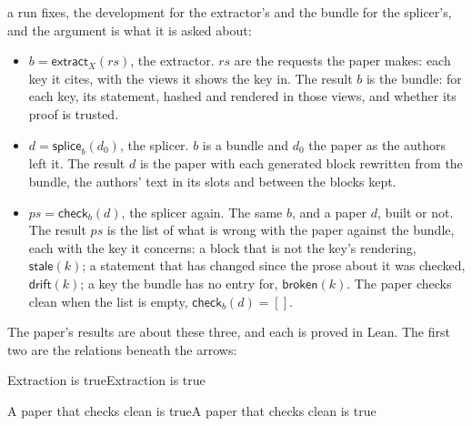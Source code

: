 \documentclass[acmsmall,screen,review,anonymous,nonacm]{acmart}
\begin{document}
a run fixes, the development for the extractor's and the bundle for the
splicer's, and the argument is what it is asked about:
\begin{itemize}
\item $b = \mathsf{extract}_{X}(\mathit{rs})$, the extractor.
  $\mathit{rs}$ are the requests the paper makes: each key it cites, with
  the views it shows the key in. The result $b$ is the bundle: for each
  key, its statement, hashed and rendered in those views, and whether its
  proof is trusted.
\item $d = \mathsf{splice}_{b}(d_{0})$, the splicer. $b$ is a bundle and
  $d_{0}$ the paper as the authors left it. The result $d$ is the paper
  with each generated block rewritten from the bundle, the authors' text
  in its slots and between the blocks kept.
\item $\mathit{ps} = \mathsf{check}_{b}(d)$, the splicer again. The same
  $b$, and a paper $d$, built or not. The result $\mathit{ps}$ is the list
  of what is wrong with the paper against the bundle, each with the key it
  concerns: a block that is not the key's rendering, $\mathsf{stale}(k)$;
  a statement that has changed since the prose about it was checked,
  $\mathsf{drift}(k)$; a key the bundle has no entry for,
  $\mathsf{broken}(k)$. The paper checks clean when the list is empty,
  $\mathsf{check}_{b}(d) = []$.
\end{itemize}
The paper's results are about these three, and each is proved in Lean. The
first two are the relations beneath the arrows:

\begin{leantheorem}[sum=ohIfXYzy6m]{Extraction is true}{Extraction is true}
\label{thm:Extraction-is-true}
\end{leantheorem}

\begin{leantheorem}[sum=AlJ52tDsqN]{A paper that checks clean is true}{A paper that checks clean is true}
\label{thm:A-paper-that-checks-clean-is-true}
\end{leantheorem}
\end{document}
